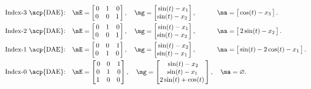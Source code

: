 \begin{equation*}
  \begin{array}{l}
    \text{Index-3 \acp{DAE}:} \quad \mE = \begin{bmatrix} \,
      0 & 1 & 0 \\
      0 & 0 & 1
    \, \end{bmatrix}, \quad
    \mg = \begin{bmatrix} \,
      \sin(t) - x_{1} \\
      \sin(t) - x_{2}
    \, \end{bmatrix}, \quad\quad~~~\,
    \ma = \begin{bmatrix} \,
      \cos(t) - x_{3}
    \, \end{bmatrix}. \\[1.0em]
    \text{Index-2 \acp{DAE}:} \quad \mE = \begin{bmatrix} \,
      0 & 1 & 0 \\
      0 & 0 & 1
    \, \end{bmatrix}, \quad
    \mg = \begin{bmatrix} \,
      \sin(t) - x_{1} \\
      \sin(t) - x_{2}
    \, \end{bmatrix}, \quad\quad~~~\,
    \ma = \begin{bmatrix} \,
      2\sin(t) - x_{2}
    \, \end{bmatrix}. \\[1.0em]
    \text{Index-1 \acp{DAE}:} \quad \mE = \begin{bmatrix} \,
      0 & 0 & 1 \\
      0 & 1 & 0
    \, \end{bmatrix}, \quad
    \mg = \begin{bmatrix} \,
      \sin(t) - x_{2} \\
      \sin(t) - x_{1}
    \, \end{bmatrix}, \quad\quad~~~\,
    \ma = \begin{bmatrix} \,
      \sin(t) - 2\cos(t) - x_{1}
    \, \end{bmatrix}. \\[1.0em]
    \text{Index-0 \acp{DAE}:} \quad \mE = \begin{bmatrix} \,
      0 & 0 & 1 \\
      0 & 1 & 0 \\
      1 & 0 & 0
    \, \end{bmatrix}, \quad
    \mg = \begin{bmatrix} \,
      \sin(t) - x_{2} \\
      \sin(t) - x_{1} \\
      2\sin(t) + \cos(t)
    \, \end{bmatrix}, \quad
    \ma = \varnothing.
  \end{array}
\end{equation*}
